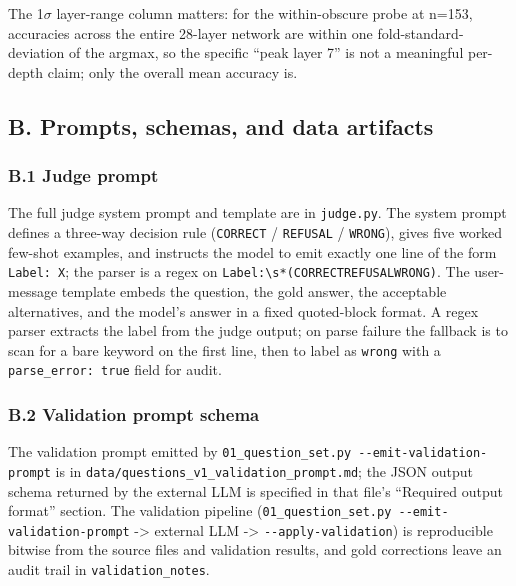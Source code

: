 The 1\(\sigma\) layer-range column matters: for the within-obscure probe
at n=153, accuracies across the entire 28-layer network are within one
fold-standard-deviation of the argmax, so the specific ``peak layer 7''
is not a meaningful per-depth claim; only the overall mean accuracy is.

\subsection{B. Prompts, schemas, and data
artifacts}\label{b.-prompts-schemas-and-data-artifacts}

\subsubsection{B.1 Judge prompt}\label{b.1-judge-prompt}

The full judge system prompt and template are in \texttt{judge.py}. The
system prompt defines a three-way decision rule (\texttt{CORRECT} /
\texttt{REFUSAL} / \texttt{WRONG}), gives five worked few-shot examples,
and instructs the model to emit exactly one line of the form
\texttt{Label:\ X}; the parser is a regex on
\texttt{Label:\textbackslash{}s*(CORRECT\textbar{}REFUSAL\textbar{}WRONG)}. The user-message template embeds the question, the
gold answer, the acceptable alternatives, and the model's answer in a
fixed quoted-block format. A regex parser extracts the label from the
judge output; on parse failure the fallback is to scan for a bare
keyword on the first line, then to label as \texttt{wrong} with a
\texttt{parse\_error:\ true} field for audit.

\subsubsection{B.2 Validation prompt
schema}\label{b.2-validation-prompt-schema}

The validation prompt emitted by
\texttt{01\_question\_set.py\ -\/-emit-validation-prompt} is in
\texttt{data/questions\_v1\_validation\_prompt.md}; the JSON output
schema returned by the external LLM is specified in that file's
``Required output format'' section. The validation pipeline
(\texttt{01\_question\_set.py\ -\/-emit-validation-prompt}
-\textgreater{} external LLM -\textgreater{}
\texttt{-\/-apply-validation}) is reproducible bitwise from the source
files and validation results, and gold corrections leave an audit trail
in \texttt{validation\_notes}.

